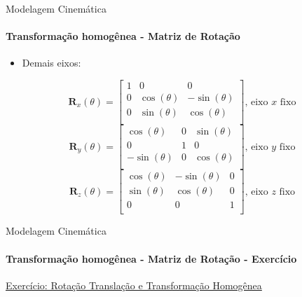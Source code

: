 \documentclass{beamer}
\begin{document}
\begin{frame}{Modelagem Cinemática}
    \framesubtitle{Transformação homogênea - Matriz de Rotação}
    \begin{itemize}
        \item Demais eixos:
    \end{itemize}
    \begin{block}{}
        \begin{equation*}
            \mathbf{R}_x(\theta) =
            \begin{bmatrix}
                1 & 0            & 0             \\
                0 & \cos(\theta) & -\sin(\theta) \\
                0 & \sin(\theta) & \cos(\theta)  \\
            \end{bmatrix} \text{, eixo $x$ fixo}
        \end{equation*}
        \begin{equation*}
            \mathbf{R}_y(\theta) =
            \begin{bmatrix}
                \cos(\theta)  & 0 & \sin(\theta) \\
                0             & 1 & 0            \\
                -\sin(\theta) & 0 & \cos(\theta) \\
            \end{bmatrix} \text{, eixo $y$ fixo}
        \end{equation*}
        \begin{equation*}
            \mathbf{R}_z(\theta) =
            \begin{bmatrix}
                \cos(\theta) & -\sin(\theta) & 0 \\
                \sin(\theta) & \cos(\theta) & 0 \\
                0            & 0            & 1 \\
            \end{bmatrix} \text{, eixo $z$ fixo}
        \end{equation*}
    \end{block}
\end{frame}

\begin{frame}{Modelagem Cinemática}
    \framesubtitle{Transformação homogênea - Matriz de Rotação - Exercício}

    \href{https://cursoseaulas.gitlab.io/robotica-movel/exercicio01.ipynb}{Exercício: Rotação Translação e Transformação Homogênea}

\end{frame}
\end{document}

